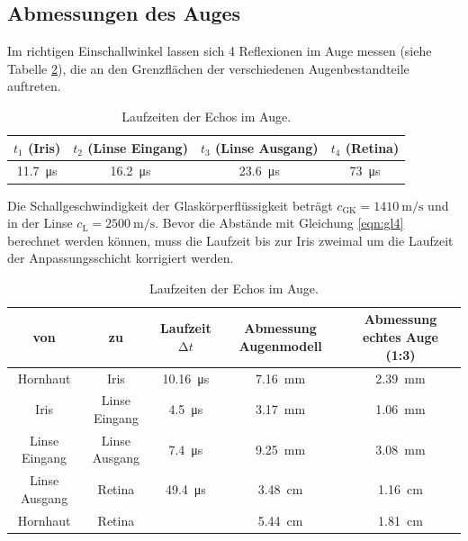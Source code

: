 \FloatBarrier

\subsection{Abmessungen des Auges}

Im richtigen Einschallwinkel lassen sich 4 Reflexionen im Auge messen (siehe Tabelle \ref{tab:Auge}), die an den Grenzflächen der verschiedenen Augenbestandteile auftreten.
\begin{table}
  \centering
  \caption{Laufzeiten der Echos im Auge.}
  \label{tab:Auge}
  \begin{tabular}{c c c c}
    \toprule
    $t_1$ (Iris) & $t_2$ (Linse Eingang) & $t_3$ (Linse Ausgang) & $t_4$ (Retina) \\
    \midrule
    \SI{11.7}{\micro\second} & \SI{16.2}{\micro\second} & \SI{23.6}{\micro\second} & \SI{73}{\micro\second} \\
    \bottomrule
  \end{tabular}
\end{table}
Die Schallgeschwindigkeit der Glaskörperflüssigkeit beträgt $c_\text{GK} = \SI{1410}{\meter\per\second}$ und in der Linse $c_\text{L} = \SI{2500}{\meter\per\second}$.
Bevor die Abstände mit Gleichung \eqref{eqn:gl4} berechnet werden können, muss die Laufzeit bis zur Iris zweimal um die Laufzeit der Anpassungsschicht korrigiert werden.
\begin{table}
  \centering
  \caption{Laufzeiten der Echos im Auge.}
  \label{tab:Auge}
  \begin{tabular}{c c c c c}
    \toprule
    von & zu & Laufzeit $\increment t$ & Abmessung Augenmodell & Abmessung echtes Auge (1:3) \\
    \midrule
    Hornhaut & Iris & \SI{10.16}{\micro\second} & \SI{7.16}{\milli\meter} & \SI{2.39}{\milli\meter}  \\
    Iris & Linse Eingang & \SI{4.5}{\micro\second} & \SI{3.17}{\milli\meter} & \SI{1.06}{\milli\meter} \\
    Linse Eingang & Linse Ausgang & \SI{7.4}{\micro\second} & \SI{9.25}{\milli\meter} & \SI{3.08}{\milli\meter} \\
    Linse Ausgang & Retina & \SI{49.4}{\micro\second} & \SI{3.48}{\centi\meter} & \SI{1.16}{\centi\meter} \\
    Hornhaut & Retina & & \SI{5.44}{\centi\meter} & \SI{1.81}{\centi\meter} \\
    \bottomrule
  \end{tabular}
\end{table}
